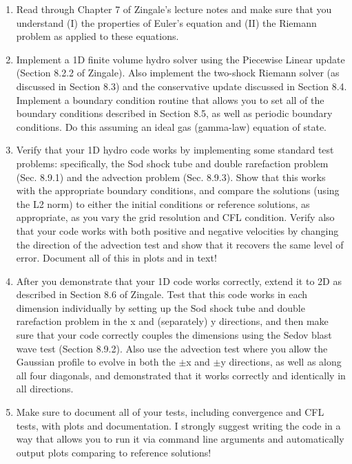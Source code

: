 \documentclass[10pt]{article}
\begin{document}
\begin{enumerate}

\item Read through Chapter 7 of Zingale's lecture notes and make sure
  that you understand (I) the properties of Euler's equation and (II)
  the Riemann problem as applied to these equations.

\item Implement a 1D finite volume hydro solver using the Piecewise
  Linear update (Section 8.2.2 of Zingale).  Also implement the
  two-shock Riemann solver (as discussed in Section 8.3) and the
  conservative update discussed in Section 8.4.  Implement a boundary
  condition routine that allows you to set all of the boundary
  conditions described in Section 8.5, as well as periodic boundary
  conditions.  Do this assuming an ideal gas (gamma-law) equation of state.

\item Verify that your 1D hydro code works by implementing some
  standard test problems: specifically, the Sod shock tube
   and double rarefaction problem (Sec. 8.9.1) and the advection
   problem (Sec. 8.9.3).  Show that this works with the appropriate
   boundary conditions, and compare the solutions (using the L2
   norm) to either the initial conditions or reference solutions, as
   appropriate, as you vary the grid resolution and CFL condition.
   Verify also that your code works with both positive and negative
   velocities by changing the direction of the advection test and show
   that it recovers the same level of error.  Document all of this in
   plots and in text!

\item After you demonstrate that your 1D code works correctly, extend
it to 2D as described in Section 8.6 of Zingale.  Test that this code
works in each dimension individually by setting up the Sod shock tube
and double rarefaction problem in the x and (separately) y directions,
and then make sure that your code correctly couples the dimensions
using the Sedov blast wave test (Section 8.9.2).  Also use the
advection test where you allow the Gaussian profile to evolve in both
the $\pm$x and $\pm$y directions, as well as along all four
diagonals, and demonstrated that it works correctly and identically in
all directions.

\item Make sure to document all of your tests, including convergence
  and CFL tests, with plots and documentation.  I strongly suggest
  writing the code in a way that allows you to run it via command line
  arguments and automatically output plots comparing to reference solutions!

\end{enumerate}
\end{document}
